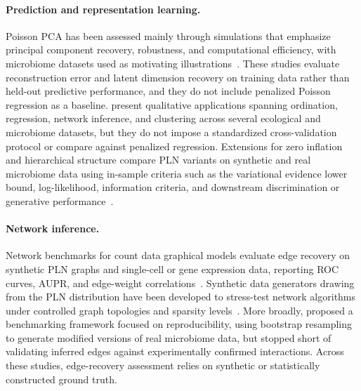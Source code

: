 \documentclass[useAMS,usenatbib,referee]{biom}
\begin{document}
\paragraph{Prediction and representation learning.}
Poisson PCA has been assessed mainly through simulations that emphasize principal component recovery, robustness, and computational efficiency, with microbiome datasets used as motivating illustrations~\citep{Kenney2021PoissonPCA, Virta2023PoissonPCA}.
These studies evaluate reconstruction error and latent dimension recovery on training data rather than held-out predictive performance, and they do not include penalized Poisson regression as a baseline.
\citet{Chiquet2021} present qualitative applications spanning ordination, regression, network inference, and clustering across several ecological and microbiome datasets, but they do not impose a standardized cross-validation protocol or compare against penalized regression.
Extensions for zero inflation and hierarchical structure compare PLN variants on synthetic and real microbiome data using in-sample criteria such as the variational evidence lower bound, log-likelihood, information criteria, and downstream discrimination or generative performance~\citep{Batardiere2025ZIPLN, Chaussard2025PLNTree}.

\paragraph{Network inference.}
Network benchmarks for count data graphical models evaluate edge recovery on synthetic PLN graphs and single-cell or gene expression data, reporting ROC curves, AUPR, and edge-weight correlations~\citep{Xiao2022PLNet}.
Synthetic data generators drawing from the PLN distribution have been developed to stress-test network algorithms under controlled graph topologies and sparsity levels~\citep{Qian2024}.
More broadly, \citet{Ghaeli2025} proposed a benchmarking framework focused on reproducibility, using bootstrap resampling to generate modified versions of real microbiome data, but stopped short of validating inferred edges against experimentally confirmed interactions.
Across these studies, edge-recovery assessment relies on synthetic or statistically constructed ground truth.
\end{document}
